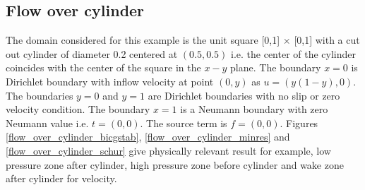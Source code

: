 \documentclass[a4paper,openany]{book}
\begin{document}
\subsection{Flow over cylinder} \label{flow_over_cylinder_stokes}

The domain considered for this example is the unit square [0,1] $\times$ [0,1] with a cut out cylinder of diameter 0.2 centered at $(0.5,0.5)$ i.e. the center of the cylinder coincides with the center of the square in the $x-y$ plane. The boundary ${x=0}$ is Dirichlet boundary with inflow velocity at point $(0,y)$ as $u = (y(1-y), 0)$. The boundaries ${y = 0}$ and ${y = 1}$ are Dirichlet boundaries with no slip or zero velocity condition. The boundary ${x = 1}$ is a Neumann boundary with zero Neumann value i.e. $t = (0, 0)$. The source term is $f = (0, 0)$. Figures \ref{flow_over_cylinder_bicgstab}, \ref{flow_over_cylinder_minres} and \ref{flow_over_cylinder_schur} give physically relevant result for example, low pressure zone after cylinder, high pressure zone before cylinder and wake zone after cylinder for velocity.
\end{document}
